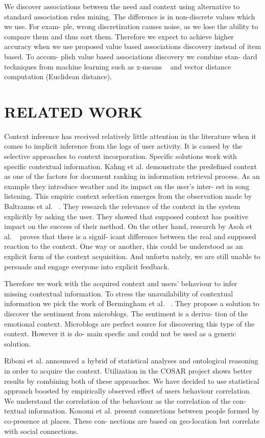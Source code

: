 \documentclass{acm_proc_article-sp}
\begin{document}
We discover associations between the need and context
using alternative to standard association rules mining. The
difference is in non-discrete values which we use. For exam-
ple, wrong discretization causes noise, as we lose the ability
to compare them and thus sort them. Therefore we expect to
achieve higher accuracy when we use proposed value based
associations discovery instead of item based. To accom-
plish value based associations discovery we combine stan-
dard techniques from machine learning such as x-means ~\cite{pelleg2000x}
and vector distance computation (Euclidean distance).

\section{RELATED WORK}
Context inference has received relatively little attention
in the literature when it comes to implicit inference from the
logs of user activity. It is caused by the selective approaches
to context incorporation. Specific solutions work with specific contextual information. Kahng et al. demonstrate
the predefined context as one of the factors for document
ranking in information retrieval process. As an example
they introduce weather and its impact on the user's inter-
est in song listening. This empiric context selection emerges
from the observation made by Baltranus et al. ~\cite{baltrunas2011context}. They research the relevance of the context in the system explicitly
by asking the user. They showed that supposed context has
positive impact on the success of their method. On the other
hand, research by Asoh et al. ~\cite{asoh2010analysis} proves that there is a signif-
icant difference between the real and supposed reaction to
the context. One way or another, this could be understood
as an explicit form of the context acquisition. And unfortu
nately, we are still unable to persuade and engage everyone
into explicit feedback.

Therefore we work with the acquired context and users'
behaviour to infer missing contextual information. To stress
the unavailability of contextual information we pick the work
of Bermingham et al. ~\cite{bermingham2010classifying}. They propose a solution to discover
the sentiment from microblogs. The sentiment is a deriva-
tion of the emotional context. Microblogs are perfect source
for discovering this type of the context. However it is do-
main specfic and could not be used as a generic solution.

Riboni et al. announced a hybrid of statistical analyses and ontological reasoning in order to acquire the context. Utilization in the COSAR project shows better results
by combining both of these approaches. We have decided
to use statistical approach boosted by empirically observed
effect of users behaviour correlation. We understand the
correlation of the behaviour as the correlation of the con-
textual information. Konomi et al. present connections
between people formed by co-presence at places. These con-
nections are based on geo-location but correlate with social
connections.
\end{document}
